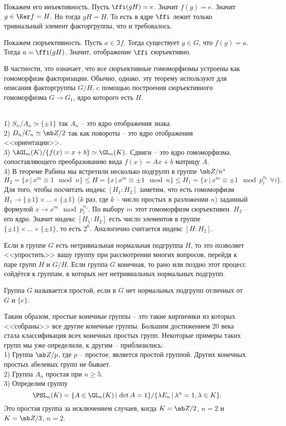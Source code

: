 Покажем его инъективность. Пусть $\ffi(gH)=e$. Значит $f(g)=e$. Значит $g\in \Ker f=H$. Но тогда $gH=H$. То есть в ядре $\ffi$ лежит только тривиальный элемент факторгруппы, что  и требовалось.

Покажем сюръективность. Пусть $a\in \Im f$. Тогда существует $g\in G$, что $f(g)=a$. Тогда $a=\ffi(gH)$. Значит, отображение $\ffi$ сюръективно.
\endproof

В частности, это означает, что все сюръективные гомоморфизмы устроены как гомоморфизм факторизации. Обычно, однако, эту теорему используют для описания факторгруппы $G/H$, c помощью построения сюръективного гомоморфизма $G \to G_1$, ядро которого есть $H$. 



\exm \\
1) $S_n/A_n\simeq \{\pm 1\}$ так $A_n$  -- это ядро отображения знака.\\
2) $D_n/C_n \simeq \mb Z/2$ так как повороты -- это ядро отображения <<ориентации>>.\\
3) $\AGL_n(K)/\{f(x)=x+b\}\simeq \GL_n(K)$. Сдвиги -- это ядро гомоморфизма, сопоставляющего преобразованию вида $f(x)=Ax+b$ матрицу $A$.\\
4) В теореме Рабина мы встретили несколько подгрупп в группе $\mb Z/n^*$ 
$$H_2=\{ x\,|\, x^m\equiv 1 \mod n\} \leq H=\{ x\,|\, x^m\equiv \pm 1 \mod n\} \leq H_1=\{ x\,|\, x^m \equiv \pm 1 \mod p_i^{\alpha_i} \,\,\forall i\}.$$
Для того, чтобы посчитать индекс $[H_1: H_2]$ заметим, что есть гомоморфизм $H_1 \to \{\pm 1\}\times \dots \times \{\pm 1\} $ ($k$ раз, где $k$ -- число простых в разложении $n$)  заданный формулой $x \to x^m \mod p_i^{\alpha_i}$. По выбору $m$ этот гомоморфизм сюръективен. $H_2$ -- его ядро. Значит индекс $[H_1:H_2]$ есть число элементов в группе $\{\pm 1\}\times \dots \times \{\pm 1\} $, то есть $2^k$. Аналогично считается индекс $[H:H_2]$.


Если в группе $G$ есть нетривиальная нормальная подгруппа $H$, то это позволяет <<упростить>> вашу группу при рассмотрении многих вопросов, перейдя к паре групп $H$ и $G/H$. Если группа $G$ конечная, то рано или поздно этот процесс сойдётся к группам, в которых нет нетривиальных нормальных подгрупп.


\dfn Группа $G$ называется простой, если в $G$ нет нормальных подгрупп отличных от $G$ и $\{e\}$.
\edfn

Таким образом, простые конечные группы -- это такие кирпичики из которых <<собраны>> все другие конечные группы. Большим достижением 20 века стала классификация всех конечных простых групп. Некоторые примеры таких групп мы уже определили, к другим -- приблизились:\\
1) Группа $\mb Z/p$, где $p$ -- простое, является простой группой. Других конечных простых абелевых групп не бывает.\\
2) Группа $A_n$ простая при $n\geq 5$.\\
3) Определим группу $$\PSL_n(K)=\{A \in \GL_n(K)\,|\, \det A=1\}/ \{ \lambda E_n\,|\, \lambda^n=1, \lambda\in K \}.$$
Это простая группа за исключением случаев, когда $K=\mb Z/2$, $n=2$ и  $K=\mb Z/3$, $n=2$.

